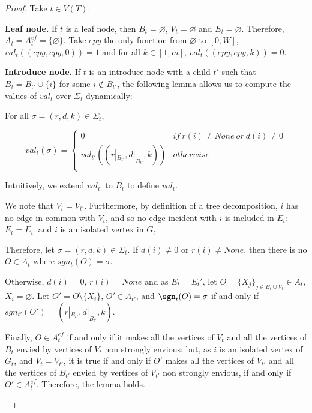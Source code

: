 \documentclass[11pt,letterpaper]{article}
\begin{document}
\begin{proof}
    Take $t\in V(T)$:

    \textbf{Leaf node.} If $t$ is a leaf node, then $B_t=\varnothing$, $V_t=\varnothing$ and $E_t=\varnothing$. Therefore, $A_t=A_t^{ef}=\{\varnothing\}$. Take $epy$ the only function from $\varnothing$ to $[0,W]$, $val_t((epy,epy,0))=1$ and for all $k\in [1,m]$, $val_t((epy,epy,k))=0$.

    \textbf{Introduce node.} If $t$ is an introduce node with a child $t'$ such that $B_t=B_{t'}\cup \{i\}$ for some $i\notin B_{t'}$, the following lemma allows us to compute the values of $val_t$ over $\Sigma_t$ dynamically:

    \begin{lemma}
        For all $\sigma = (r,d,k)\in \Sigma_t$,

        \[val_t(\sigma)=\begin{cases}
            0 & if\ r(i)\neq None\ or\ d(i)\neq 0 \\
            val_{t'}((r|_{B_{t'}},d|_{B_{t'}},k)) & otherwise\\
        \end{cases}\]
    \end{lemma}

    Intuitively, we extend $val_{t'}$ to $B_t$ to define $val_t$.

    \begin{nestedproof}
        We note that $V_t=V_{t'}$. Furthermore, by definition of a tree decomposition, $i$ has no edge in common with $V_t$, and so no edge incident with $i$ is included in $E_t$: $E_t=E_{t'}$ and $i$ is an isolated vertex in $G_t$.

        Therefore, let $\sigma=(r,d,k)\in \Sigma_t$. If $d(i)\neq 0$ or $r(i)\neq None$, then there is no $O\in A_t$ where $sgn_t(O)=\sigma$.

        Otherwise, $d(i)=0$, $r(i)=None$ and as $E_t=E_t'$, let $O=\{X_j\}_{j\in B_t\cup V_t}\in A_t$, $X_i=\varnothing$. Let $O'=O\setminus\{X_i\}$, $O'\in A_{t'}$, and $\sgn_t(O)=\sigma$ if and only if $sgn_{t'}(O')=(r|_{B_{t'}},d|_{B_{t'}},k)$.

        Finally, $O\in A_t^{ef}$ if and only if it makes all the vertices of $V_t$ and all the vertices of $B_t$ envied by vertices of $V_t$ non strongly envious; but, as $i$ is an isolated vertex of $G_t$, and $V_t=V_{t'}$, it is true if and only if $O'$ makes all the vertices of $V_{t'}$ and all the vertices of $B_{t'}$ envied by vertices of $V_{t'}$ non strongly envious, if and only if $O'\in A_t^{ef}$. Therefore, the lemma holds.
    \end{nestedproof}


\end{proof}
\end{document}
